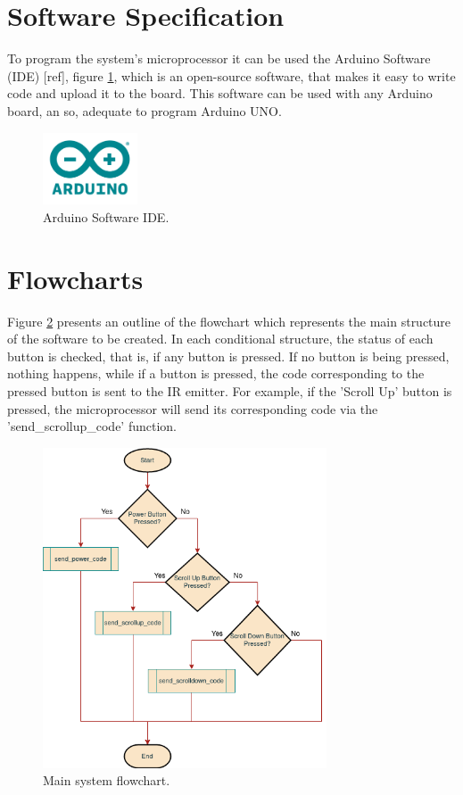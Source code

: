 \documentclass[12pt, letterpaper]{report}
\begin{document}
\section{Software Specification}
To program the system’s microprocessor it can be used the Arduino Software (IDE) [ref], figure \ref{fig:arduino}, which is an open-source software, that makes it easy to write code and upload it to the board. This software can be used with any Arduino board, an so, adequate to program Arduino UNO.

\begin{figure}[ht]
	\centering
	\includegraphics[width=0.25\textwidth]{arduino}
	\caption{Arduino Software IDE.}
	\label{fig:arduino}
\end{figure}

\section{Flowcharts}
Figure \ref{fig:Flowchart} presents an outline of the flowchart which represents the main structure of the software to be created. In each conditional structure, the status of each button is checked, that is, if any button is pressed. If no button is being pressed, nothing happens, while if a button is pressed, the code corresponding to the pressed button is sent to the IR emitter. For example, if the 'Scroll Up' button is pressed, the microprocessor will send its corresponding code via the 'send\_scrollup\_code' function.

\begin{figure}[ht]
	\centering
	\includegraphics[width=0.75\textwidth]{Flowchart}
	\caption{Main system flowchart.}
	\label{fig:Flowchart}
\end{figure}



\end{document}
